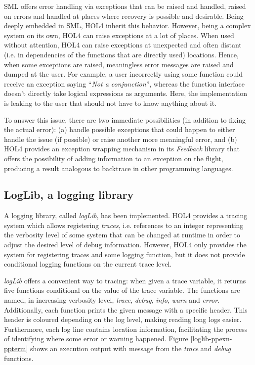 \documentclass{kththesis}
\begin{document}
{\gls{SML} offers error handling via exceptions that can be raised and handled, raised on errors and handled at places where recovery is possible and desirable. Being deeply embedded in SML, HOL4 inherit this behavior. However, being a complex system on its own, HOL4 can raise exceptions at a lot of places. When used without attention, HOL4 can raise exceptions at unexpected and often distant (i.e. in dependencies of the functions that are directly used) locations. Hence, when some exceptions are raised, meaningless error messages are raised and dumped at the user. For example, a user incorrectly using some function could receive an exception saying ``\textit{Not a conjunction}'', whereas the function interface doesn't directly take logical expressions as arguments. Here, the implementation is leaking to the user that should not have to know anything about it.

To answer this issue, there are two immediate possibilities (in addition to fixing the actual error): (a) handle possible exceptions that could happen to either handle the issue (if possible) or raise another more meaningful error, and (b) HOL4 provides an exception wrapping mechanism in its \textit{Feedback} library that offers the possibility of adding information to an exception on the flight, producing a result analogous to backtrace in other programming languages.

\subsection{LogLib, a logging library} \label{loglib}

A logging library, called \textit{logLib}, has been implemented. HOL4 provides a tracing system which allows registering \textit{traces}, i.e. references to an integer representing the verbosity level of some system that can be changed at runtime in order to adjust the desired level of debug information. However, HOL4 only provides the system for registering traces and some logging function, but it does not provide conditional logging functions on the current trace level.

\textit{logLib} offers a convenient way to tracing: when given a trace variable, it returns five functions conditional on the value of the trace variable. The functions are named, in increasing verbosity level, \textit{trace}, \textit{debug}, \textit{info}, \textit{warn} and \textit{error}. Additionally, each function prints the given message with a specific header. This header is coloured depending on the log level, making reading long logs easier. Furthermore, each log line contains location information, facilitating the process of identifying where some error or warning happened. Figure \ref{loglib-ppexn-ppterm} shows an execution output with message from the \textit{trace} and \textit{debug} functions.

}
\end{document}
